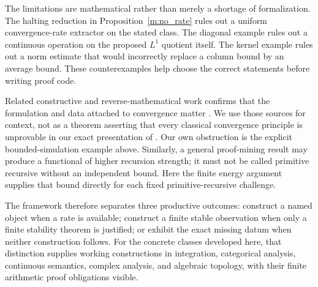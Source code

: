 The limitations are mathematical rather than merely a shortage of
formalization. The halting reduction in Proposition~\ref{m:no_rate}
rules out a uniform convergence-rate extractor on the stated class.
The diagonal example rules out a continuous operation on the proposed
\(L^1\) quotient itself. The kernel example rules out a norm estimate
that would incorrectly replace a column bound by an average bound.
These counterexamples help choose the correct statements before
writing proof code.

Related constructive and reverse-mathematical work confirms that
the formulation and data attached to convergence matter
\cite{avigad-dean-rute,metastable-dct}. We use those sources for context,
not as a theorem asserting that every classical convergence principle
is unprovable in our exact presentation of \ipra. Our own obstruction
is the explicit bounded-simulation example above. Similarly, a
general proof-mining result may produce a functional of higher
recursion strength; it must not be called primitive recursive without
an independent bound. Here the finite energy argument supplies that
bound directly for each fixed primitive-recursive challenge.

The framework therefore separates three productive outcomes:
construct a named object when a rate is available; construct a finite
stable observation when only a finite stability theorem is justified;
or exhibit the exact missing datum when neither construction follows.
For the concrete classes developed here, that distinction supplies
working constructions in integration, categorical analysis,
continuous semantics, complex analysis, and algebraic topology, with
their finite arithmetic proof obligations visible.
